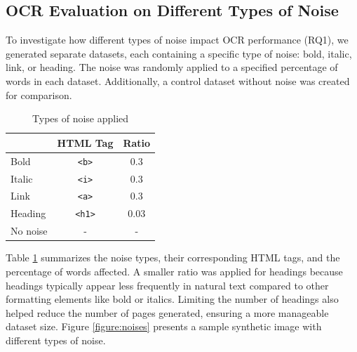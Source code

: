 \documentclass[12pt,oneside]{memoir}
\begin{document}
\subsection{OCR Evaluation on Different Types of Noise}

To investigate how different types of noise impact OCR performance (RQ1), we generated separate datasets, each containing a specific type of noise: bold, italic, link, or heading. 
The noise was randomly applied to a specified percentage of words in each dataset. 
Additionally, a control dataset without noise was created for comparison.

\begin{table}[ht]
    \centering
    \caption{Types of noise applied}
    \label{table:noises}
    \begin{tabular}{lcc}
        \toprule
        & HTML Tag & Ratio\\
        \midrule
        Bold & \texttt{<b>} & 0.3\\
        Italic & \texttt{<i>} & 0.3\\
        Link & \texttt{<a>} & 0.3\\
        Heading & \texttt{<h1>} & 0.03\\
        No noise & - & -\\
        \bottomrule
    \end{tabular}
\end{table}

Table \ref{table:noises} summarizes the noise types, their corresponding HTML tags, and the percentage of words affected.
A smaller ratio was applied for headings because headings typically appear less frequently in natural text compared to other formatting elements like bold or italics.
Limiting the number of headings also helped reduce the number of pages generated, ensuring a more manageable dataset size.
Figure \ref{figure:noises} presents a sample synthetic image with different types of noise.
\end{document}
